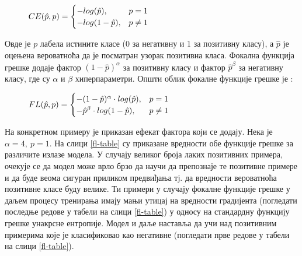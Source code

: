\documentclass[11pt,oneside]{memoir}
\begin{document}
\begin{figure}[H]
  \centering
  $ CE(\hat{p}, p) =
  \begin{cases}
    \centering
    -log(\hat{p}), & p = 1 \\
    -log(1-\hat{p}), & p \neq 1
  \end{cases}
  $
\end{figure}

Овде је $p$ лабела истините класе (0 за негативну и 1 за позитивну класу), а $\hat{p}$ је оцењена вероватноћа да је посматран узорак позитивна класа.
Фокална функција грешке додаје фактор $(1 - \hat{p})^{\alpha}$ за позитивну класу и фактор $\hat{p}^{\beta}$
за негативну класу, где су $\alpha$ и $\beta$ хиперпараметри. Општи облик фокалне функције грешке је \cite{focal_loss}:

\begin{figure}[H]
  \centering
  $ FL(\hat{p}, p) =
  \begin{cases}
    \centering
    -(1 - \hat{p})^{\alpha}\cdot log(\hat{p}) , & p = 1 \\
    -\hat{p}^{\beta}\cdot log(1-\hat{p}), & p \neq 1
  \end{cases}
  $
\end{figure}

На конкретном примеру је приказан ефекат фактора који се додају. Нека је $\alpha = 4,\ p = 1$. На слици \ref{fl-table} су приказане
вредности обе функције грешке за различите излазе модела. У случају великог броја лаких позитивних примера, очекује се да модел 
може врло брзо да научи да препознаје те позитивне примере и да буде веома сигуран приликом предвиђања тј. да вредности 
вероватноћа позитивне класе буду велике. Ти примери у случају фокалне функције грешке у даљем процесу тренирања имају мањи утицај
на вредности градијента (погледати последње редове у табели на слици \ref{fl-table}) у односу на стандардну функцију грешке унакрсне ентропије. 
Модел и даље наставља да учи над позитивним примерима које је класификовао као негативне (погледати прве редове у табели на слици \ref{fl-table}).
\end{document}
